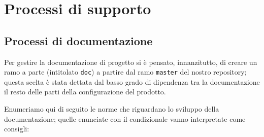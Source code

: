 \section{Processi di supporto}

\subsection{Processi di documentazione}
Per gestire la documentazione di progetto si è pensato, innanzitutto, di creare un ramo a parte (intitolato \texttt{doc}) a partire dal ramo \texttt{master} del nostro repository; questa scelta è stata dettata dal basso grado di dipendenza tra la documentazione il resto delle parti della configurazione del prodotto.

Enumeriamo qui di seguito le norme che riguardano lo sviluppo della documentazione; quelle enunciate con il condizionale vanno interpretate come consigli:
